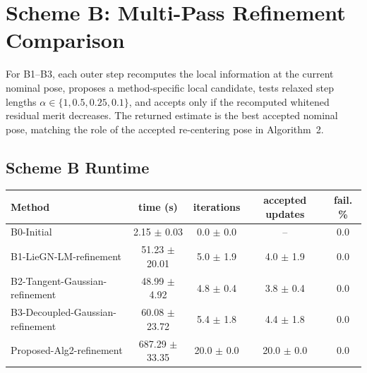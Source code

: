 \documentclass[11pt]{article}
\begin{document}
\section*{Scheme B: Multi-Pass Refinement Comparison}
For B1--B3, each outer step recomputes the local information at the current
nominal pose, proposes a method-specific local candidate, tests relaxed step
lengths $\alpha\in\{1,0.5,0.25,0.1\}$, and accepts only if the recomputed
whitened residual merit decreases.  The returned estimate is the best accepted
nominal pose, matching the role of the accepted re-centering pose in
Algorithm~2.

\begingroup
\small
\setlength{\tabcolsep}{2.7pt}
\noindent{}
\endgroup

\subsection*{Scheme B Runtime}
\begingroup
\small
\setlength{\tabcolsep}{5pt}
\begin{tabular}{l c c c c}
\toprule
Method & time (s) & iterations & accepted updates & fail. \% \\
\midrule
B0-Initial & 2.15 $\pm$ 0.03 & 0.0 $\pm$ 0.0 & -- & 0.0 \\
B1-LieGN-LM-refinement & 51.23 $\pm$ 20.01 & 5.0 $\pm$ 1.9 & 4.0 $\pm$ 1.9 & 0.0 \\
B2-Tangent-Gaussian-refinement & 48.99 $\pm$ 4.92 & 4.8 $\pm$ 0.4 & 3.8 $\pm$ 0.4 & 0.0 \\
B3-Decoupled-Gaussian-refinement & 60.08 $\pm$ 23.72 & 5.4 $\pm$ 1.8 & 4.4 $\pm$ 1.8 & 0.0 \\
Proposed-Alg2-refinement & 687.29 $\pm$ 33.35 & 20.0 $\pm$ 0.0 & 20.0 $\pm$ 0.0 & 0.0 \\
\bottomrule
\end{tabular}
\endgroup
\end{document}
